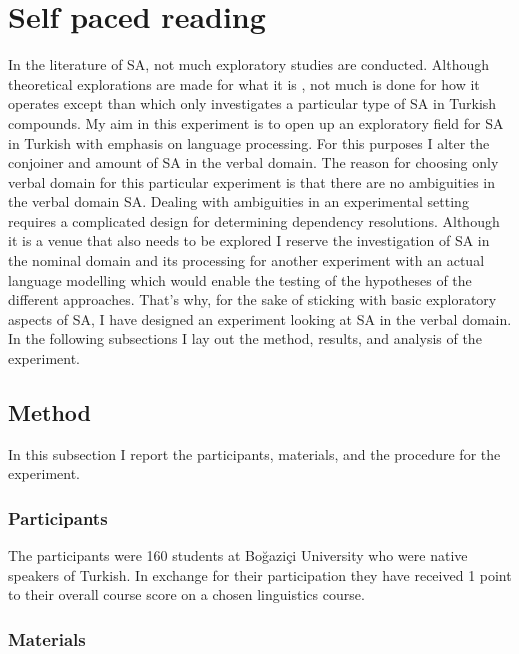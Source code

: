 







\section{Self paced reading}

In the literature of SA, not much exploratory studies are conducted. Although theoretical explorations are made for what it is \citep{kornfilt1996some,kornfilt2012revisiting,kabak2007turkish,broadwell2008turkish}, not much is done for how it operates except than \cite{kharytonava2012word,kharytonava2012taming} which only investigates a particular type of SA in Turkish compounds. My aim in this experiment is to open up an exploratory field for SA in Turkish with emphasis on language processing. For this purposes I alter the conjoiner and amount of SA in the verbal domain. The reason for choosing only verbal domain for this particular experiment is that there are no ambiguities in the verbal domain SA. Dealing with ambiguities in an experimental setting requires a complicated design for determining dependency resolutions. Although it is a venue that also needs to be explored I reserve the investigation of SA in the nominal domain and its processing for another experiment with an actual language modelling which would enable the testing of the hypotheses of the different approaches. That's why, for the sake of sticking with basic exploratory aspects of SA, I have designed an experiment looking at SA in the verbal domain. In the following subsections I lay out the method, results, and analysis of the experiment.

\subsection{Method}
In this subsection I report the participants, materials, and the procedure for the experiment.

\subsubsection{Participants}

The participants were 160 students at Boğaziçi University who were native speakers of Turkish. In exchange for their participation they have received 1 point to their overall course score on a chosen linguistics course.

\subsubsection{Materials}

